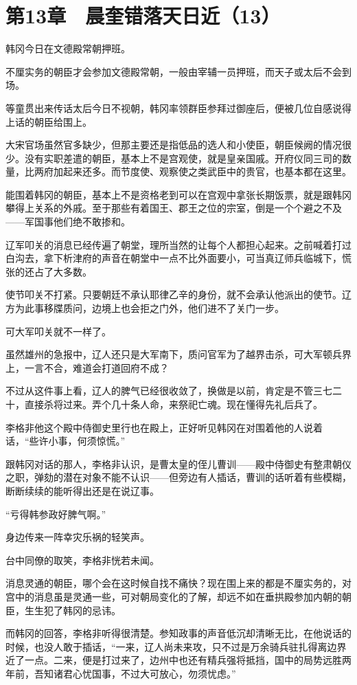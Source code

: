 \section{第13章　晨奎错落天日近（13）}

韩冈今日在文德殿常朝押班。

不厘实务的朝臣才会参加文德殿常朝，一般由宰辅一员押班，而天子或太后不会到场。

等童贯出来传话太后今日不视朝，韩冈率领群臣参拜过御座后，便被几位自感说得上话的朝臣给围上。

大宋官场虽然官多缺少，但那主要还是指低品的选人和小使臣，朝臣候阙的情况很少。没有实职差遣的朝臣，基本上不是宫观使，就是皇亲国戚。开府仪同三司的数量，比两府加起来还多。而节度使、观察使之类武臣中的贵官，也基本都在这里。

能围着韩冈的朝臣，基本上不是资格老到可以在宫观中拿张长期饭票，就是跟韩冈攀得上关系的外戚。至于那些有着国王、郡王之位的宗室，倒是一个个避之不及——军国事他们绝不敢掺和。

辽军叩关的消息已经传遍了朝堂，理所当然的让每个人都担心起来。之前喊着打过白沟去，拿下析津府的声音在朝堂中一点不比外面要小，可当真辽师兵临城下，慌张的还占了大多数。

使节叩关不打紧。只要朝廷不承认耶律乙辛的身份，就不会承认他派出的使节。辽方为此事移牒质问，边境上也会拒之门外，他们进不了关门一步。

可大军叩关就不一样了。

虽然雄州的急报中，辽人还只是大军南下，质问官军为了越界击杀，可大军顿兵界上，一言不合，难道会打道回府不成？

不过从这件事上看，辽人的脾气已经很收敛了，换做是以前，肯定是不管三七二十，直接杀将过来。弄个几十条人命，来祭祀亡魂。现在懂得先礼后兵了。

李格非他这个殿中侍御史里行也在殿上，正好听见韩冈在对围着他的人说着话，“些许小事，何须惊慌。”

跟韩冈对话的那人，李格非认识，是曹太皇的侄儿曹训——殿中侍御史有整肃朝仪之职，弹劾的潜在对象不能不认识——但旁边有人插话，曹训的话听着有些模糊，断断续续的能听得出还是在说辽事。

“亏得韩参政好脾气啊。”

身边传来一阵幸灾乐祸的轻笑声。

台中同僚的取笑，李格非恍若未闻。

消息灵通的朝臣，哪个会在这时候自找不痛快？现在围上来的都是不厘实务的，对宫中的消息虽是灵通一些，可对朝局变化的了解，却远不如在垂拱殿参加内朝的朝臣，生生犯了韩冈的忌讳。

而韩冈的回答，李格非听得很清楚。参知政事的声音低沉却清晰无比，在他说话的时候，也没人敢于插话，“一来，辽人尚未来攻，只不过是万余骑兵驻扎得离边界近了一点。二来，便是打过来了，边州中也还有精兵强将抵挡，国中的局势远胜两年前，吾知诸君心忧国事，不过大可放心，勿须忧虑。”

